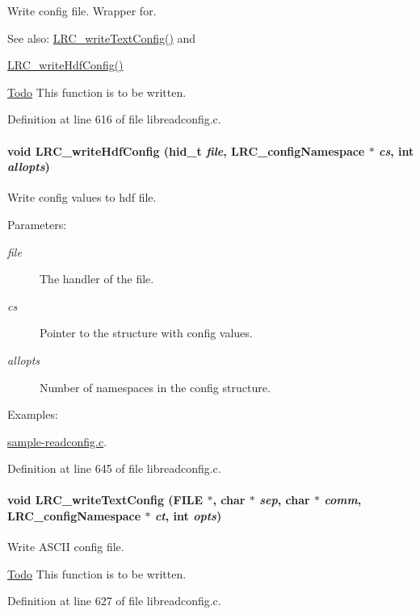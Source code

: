 Write config file. Wrapper for. 

\begin{Desc}
\item[See also:]\hyperlink{group___l_r_c__wrappers_g42c90a023c4cc3048b39a65245e889e4}{LRC\_\-writeTextConfig()} and 

\hyperlink{group___l_r_c__wrappers_g142e285d5c8a3e6761d1a86668cfe9eb}{LRC\_\-writeHdfConfig()}\end{Desc}
\begin{Desc}
\item[\hyperlink{todo__todo000006}{Todo}]This function is to be written. \end{Desc}


Definition at line 616 of file libreadconfig.c.\hypertarget{group___l_r_c__wrappers_g142e285d5c8a3e6761d1a86668cfe9eb}{
\paragraph[{LRC\_\-writeHdfConfig}]{\setlength{\rightskip}{0pt plus 5cm}void LRC\_\-writeHdfConfig (hid\_\-t {\em file}, \/  {\bf LRC\_\-configNamespace} $\ast$ {\em cs}, \/  int {\em allopts})}\hfill}
\label{group___l_r_c__wrappers_g142e285d5c8a3e6761d1a86668cfe9eb}


Write config values to hdf file. 

\begin{Desc}
\item[Parameters:]
\begin{description}
\item[{\em file}]The handler of the file.\item[{\em cs}]Pointer to the structure with config values.\item[{\em allopts}]Number of namespaces in the config structure. \end{description}
\end{Desc}
\begin{Desc}
\item[Examples: ]\par
\hyperlink{sample-readconfig_8c-example}{sample-readconfig.c}.\end{Desc}


Definition at line 645 of file libreadconfig.c.\hypertarget{group___l_r_c__wrappers_g42c90a023c4cc3048b39a65245e889e4}{
\paragraph[{LRC\_\-writeTextConfig}]{\setlength{\rightskip}{0pt plus 5cm}void LRC\_\-writeTextConfig (FILE $\ast$, \/  char $\ast$ {\em sep}, \/  char $\ast$ {\em comm}, \/  {\bf LRC\_\-configNamespace} $\ast$ {\em ct}, \/  int {\em opts})}\hfill}
\label{group___l_r_c__wrappers_g42c90a023c4cc3048b39a65245e889e4}


Write ASCII config file. 

\begin{Desc}
\item[\hyperlink{todo__todo000007}{Todo}]This function is to be written. \end{Desc}


Definition at line 627 of file libreadconfig.c.